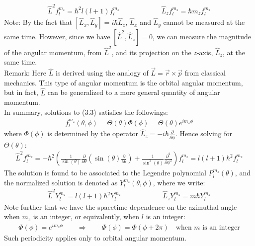 \documentclass[11pt]{book}
\theoremstyle{break}
\theoremstyle{break}
\newcommand{\pd}{\partial}
\newcommand{\note}{\color{red}Note: \color{black}}
\newcommand{\remark}{\color{blue}Remark: \color{black}}
\begin{document}
\begin{align*}
\hat{L}^2 f_l^{m_z} = \hbar^2l(l+1) f_l^{m_z} \qquad\qquad\qquad \hat{L}_z f_l^{m_z} = \hbar m_z f_l^{m_z}
\end{align*}
\note By the fact that $[\hat{L}_x,\hat{L}_y] = i\hbar \hat{L}_z$, $\hat{L}_x$ and $\hat{L}_y$ cannot be measured at the same time. However, since we have $[\hat{L}^2, \hat{L}_z] = 0$, we can measure the magnitude of the angular momentum, from $\hat{L}^2$, and its projection on the $z$-axis, $\hat{L}_z$, at the same time.  \\

\remark Here $\hat{L}$ is derived using the analogy of $\vec{L} = \vec{r}\times\vec{p}$ from classical mechanics. This type of angular momentum is the orbital angular momentum, but in fact, $\hat{L}$ can be generalized to a more general quantity of angular momentum.  \\

In summary, solutions to (3.3) satisfies the followings:
\begin{align}
f_{l}^{m_z}(\theta,\phi) = \Theta(\theta) \Phi(\phi) = \Theta(\theta) e^{im_z \phi}
\end{align}
where $\Phi(\phi)$ is determined by the operator $\hat{L}_z = -i\hbar \frac{\pd}{\pd \phi}$. Hence solving for $\Theta(\theta)$:
\begin{align*}
\hat{L}^2 f_{l}^{m_z} = -\hbar^2 \left( \frac{1}{\sin(\theta)} \frac{\pd}{\pd \theta}\left( \sin(\theta) \frac{\pd}{\pd \theta}\right) + \frac{1}{\sin^2(\theta)}\frac{\pd^2}{\pd \phi^2}\right) f_{l}^{m_z} = l(l+1) \hbar^2 f_{l}^{m_z}
\end{align*}
The solution is found to be associated to the Legendre polynomial $P_l^{m_z}(\theta)$, and the normalized solution is denoted as $Y_l^{m_z}(\theta, \phi)$, where we write:
\begin{align*}
\hat{L}^2 Y_l^{m_z}  = l(l+1) \hbar^2 Y_l^{m_z} \qquad\qquad\qquad \hat{L}_z Y_{l}^{m_z} = m\hbar Y_l^{m_z}
\end{align*}
Note further that we have the spacetime dependence on the azimuthal angle when $m_z$ is an integer, or equivalently, when $l$ is an integer:
\begin{align*}
\Phi(\phi) = e^{im_z\phi}\qquad \Rightarrow \qquad \Phi(\phi) = \Phi(\phi+2\pi)\quad \text{when }m\text{ is an integer}
\end{align*}
Such periodicity applies only to orbital angular momentum.




\newpage
\end{document}
